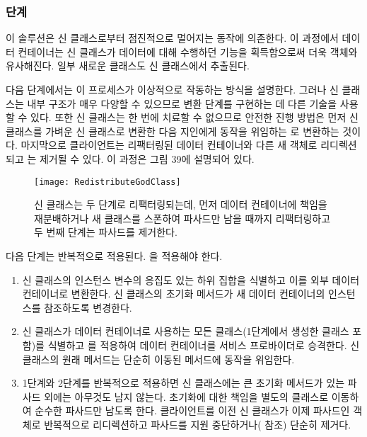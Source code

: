 \documentclass[a4paper,10pt,twoside]{book}
\begin{document}
\subsubsection*{단계}

이 솔루션은 신 클래스로부터 점진적으로 멀어지는 동작에 의존한다. 이 과정에서 데이터 컨테이너는 신 클래스가 데이터에 대해 수행하던 기능을 획득함으로써 더욱 객체와 유사해진다. 일부 새로운 클래스도 신 클래스에서 추출된다.

다음 단계에서는 이 프로세스가 이상적으로 작동하는 방식을 설명한다. 그러나 신 클래스는 내부 구조가 매우 다양할 수 있으므로 변환 단계를 구현하는 데 다른 기술을 사용할 수 있다. 또한 신 클래스는 한 번에 치료할 수 없으므로 안전한 진행 방법은 먼저 신 클래스를 가벼운 신 클래스로 변환한 다음 지인에게 동작을 위임하는 로 변환하는 것이다. 마지막으로 클라이언트는 리팩터링된 데이터 컨테이너와 다른 새 객체로 리디렉션되고 는 제거될 수 있다. 이 과정은 그림 39에 설명되어 있다.

\begin{figure}
\begin{center}
\texttt{[image: RedistributeGodClass]}
\caption{신 클래스는 두 단계로 리팩터링되는데, 먼저 데이터 컨테이너에 책임을 재분배하거나 새 클래스를 스폰하여 파사드만 남을 때까지 리팩터링하고 두 번째 단계는 파사드를 제거한다.}
\end{center}
\end{figure}

다음 단계는 반복적으로 적용된다. 을 적용해야 한다.
\begin{enumerate}
\item 신 클래스의 인스턴스 변수의 응집도 있는 하위 집합을 식별하고 이를 외부 데이터 컨테이너로 변환한다. 신 클래스의 초기화 메서드가 새 데이터 컨테이너의 인스턴스를 참조하도록 변경한다.

\item 신 클래스가 데이터 컨테이너로 사용하는 모든 클래스(1단계에서 생성한 클래스 포함)를 식별하고 를 적용하여 데이터 컨테이너를 서비스 프로바이더로 승격한다. 신 클래스의 원래 메서드는 단순히 이동된 메서드에 동작을 위임한다.

\item 1단계와 2단계를 반복적으로 적용하면 신 클래스에는 큰 초기화 메서드가 있는 파사드 외에는 아무것도 남지 않는다. 초기화에 대한 책임을 별도의 클래스로 이동하여 순수한 파사드만 남도록 한다. 클라이언트를 이전 신 클래스가 이제 파사드인 객체로 반복적으로 리디렉션하고 파사드를 지원 중단하거나( 참조) 단순히 제거다.
\end{enumerate}
\end{document}
